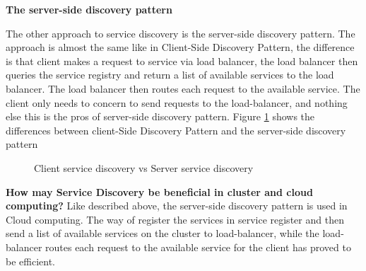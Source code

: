 \textbf{The server-side discovery pattern}

The other approach to service discovery is the server-side discovery pattern. The approach is almost the same like in Client-Side Discovery Pattern, the difference is that client makes a request to service via load balancer, the load balancer then queries the service registry and return a list of available services to the load balancer. The load balancer then routes each request to the available service. The client only needs to concern to send requests to the load-balancer, and nothing else this is the pros of server-side discovery pattern.    Figure \ref{fig:ClienServerService} shows the differences between client-Side Discovery Pattern and the server-side discovery pattern  



\begin{figure}[bth]
	\centering
	\qquad
	\caption{Client service discovery vs Server service discovery }
	\label{fig:ClienServerService}
\end{figure}



\textbf{How may Service Discovery be beneficial in cluster and cloud computing?}  
Like described above, the server-side discovery pattern is used in Cloud computing. The way of register the services in service register and then send a list of available services on the cluster to load-balancer, while the load-balancer routes each request to the available service for the client has proved to be efficient.   
